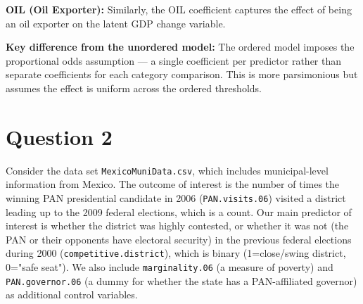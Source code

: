 \documentclass[12pt,letterpaper]{article}
\begin{document}
\begin{enumerate}
\textbf{OIL (Oil Exporter):} Similarly, the OIL coefficient captures the effect of being an oil exporter on the latent GDP change variable.

\textbf{Key difference from the unordered model:} The ordered model imposes the proportional odds assumption --- a single coefficient per predictor rather than separate coefficients for each category comparison. This is more parsimonious but assumes the effect is uniform across the ordered thresholds.


\end{enumerate}

\newpage

\section*{Question 2}
\vspace{.25cm}

\noindent Consider the data set \texttt{MexicoMuniData.csv}, which includes municipal-level information from Mexico. The outcome of interest is the number of times the winning PAN presidential candidate in 2006 (\texttt{PAN.visits.06}) visited a district leading up to the 2009 federal elections, which is a count. Our main predictor of interest is whether the district was highly contested, or whether it was not (the PAN or their opponents have electoral security) in the previous federal elections during 2000 (\texttt{competitive.district}), which is binary (1=close/swing district, 0="safe seat"). We also include \texttt{marginality.06} (a measure of poverty) and \texttt{PAN.governor.06} (a dummy for whether the state has a PAN-affiliated governor) as additional control variables.
\end{document}
